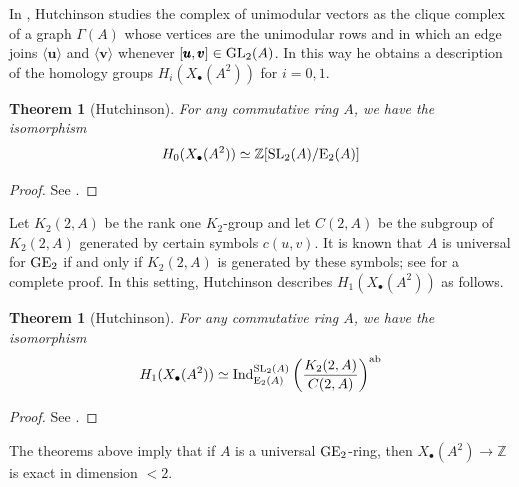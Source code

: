 \documentclass[11pt]{amsart}
\theoremstyle{definition}
\theoremstyle{plain}
\newtheorem{prp}[ntn]{Proposition}
\newtheorem{thm}[ntn]{Theorem}
\theoremstyle{definition}
\numberwithin{equation}{section}
\newcommand{\z}{\mathbb{Z}}
\newcommand{\lan}{\langle}
\newcommand{\ran}{\rangle}
\newcommand{\GE}{{\rm GE}}
\newcommand{\Ee}{\mathrm{E}}
\newcommand{\Ind}{{\rm Ind}}
\newcommand{\GL}{\mathit{{\rm GL}}}
\newcommand{\SL}{\mathit{{\rm SL}}}
\begin{document}
	In \cite{hutchinson2022}, Hutchinson studies the complex of unimodular vectors as the clique complex of a graph $\Gamma(A)$ whose vertices are the unimodular rows and in which an edge joins $\lan\pmb{u}\ran$ and $\lan\pmb{v}\ran$ whenever $[\pmb{u},\pmb{v}]\in \GL_2(A)$. In this way he obtains a description of the homology groups $H_i(X_\bullet(A^2))$ for $i=0,1$. 
	\begin{thm}[Hutchinson]
		For any commutative ring $A$, we have the isomorphism
		\[
		H_0(X_\bullet(A^2))\simeq\z[\SL_2(A)/\Ee_2(A)]
		\]
	\end{thm}
	\begin{proof}
		See \cite[Theorem 2.3]{B-E--2026}.
	\end{proof}
	Let $K_2(2,A)$ be the rank one $K_2$-group and let $C(2,A)$ be the subgroup of $K_2(2,A)$ generated by certain symbols $c(u,v)$. It is known that $A$ is universal for $\GE_2$ if and only if $K_2(2,A)$ is generated by these symbols; see \cite[Appendix A]{hutchinson2022} for a complete proof. In this setting, Hutchinson describes $H_1(X_\bullet(A^2))$ as follows.
	\begin{thm}[Hutchinson]
		For any commutative ring $A$, we have the isomorphism
		\[
		H_1(X_\bullet(A^2))\simeq \Ind^{\SL_2(A)}_{\Ee_2(A)}\left(\frac{K_2(2,A)}{C(2,A)}\right)^{\textrm{ab}}
		\]
	\end{thm}
	\begin{proof}
		See \cite[Theorem 2.5]{B-E--2026}.
	\end{proof}
	The theorems above imply that if $A$ is a universal $\GE_2$-ring, then $X_\bullet(A^2)\to\z$ is exact in dimension $<2$.
	
\end{document}

